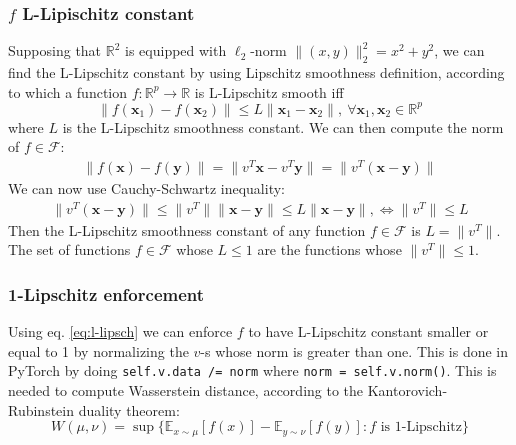 \documentclass[12pt]{article}
\begin{document}
\subsubsection{\texorpdfstring{$f$}{Lg} L-Lipischitz constant}
Supposing that $\mathbb{R}^{2}$ is equipped with $\ell_{2}$-norm $\lVert (x, y) \rVert_{2}^{2} = x^{2} + y^{2}$, we can find the L-Lipschitz constant by using Lipschitz smoothness definition, according to which a function $f : \mathbb{R}^p \rightarrow \mathbb{R}$ is L-Lipschitz smooth iff
\begin{equation} \label{def:lipschitz}
    \lVert f(\mathbf{x}_{1}) - f(\mathbf{x}_{2}) \rVert \leq L \lVert \mathbf{x}_{1} - \mathbf{x}_{2} \rVert, 
        \ \forall \mathbf{x}_{1}, \mathbf{x}_{2} \in \mathbb{R}^{p}
\end{equation}
where $L$ is the L-Lipschitz smoothness constant. We can then compute the norm of $f \in \mathcal{F}$:
\begin{gather}
    \lVert f(\mathbf{x}) - f(\mathbf{y}) \rVert = \lVert v^{T} \mathbf{x} - v^{T} \mathbf{y} \rVert = 
        \lVert v^{T} (\mathbf{x} - \mathbf{y}) \rVert
\end{gather}
We can now use Cauchy-Schwartz inequality:
\begin{gather} \label{eq:l-lipsch}
        \lVert v^{T} (\mathbf{x} - \mathbf{y}) \rVert \leq \lVert v^{T} \rVert \lVert \mathbf{x} - \mathbf{y} \rVert \leq L \lVert \mathbf{x} - \mathbf{y} \rVert, \iff \lVert v^{T} \rVert \leq L
\end{gather}
Then the L-Lipschitz smoothness constant of any function $f \in \mathcal{F}$ is $L = \lVert v^{T} \rVert$. The set of functions $f \in \mathcal{F}$ whose $L \leq 1$ are the functions whose $\lVert v^{T} \rVert \leq 1$.

\subsubsection{1-Lipschitz enforcement}

Using eq. \eqref{eq:l-lipsch} we can enforce $f$ to have L-Lipschitz constant smaller or equal to 1 by normalizing the $v$-s whose norm is greater than one. This is done in PyTorch by doing \texttt{self.v.data /= norm} where \texttt{norm = self.v.norm()}. This is needed to compute Wasserstein distance, according to the Kantorovich-Rubinstein duality theorem:
\begin{equation}
    W(\mu, \nu) = \sup{\{ \mathbb{E}_{x \sim \mu} [f(x)] - \mathbb{E}_{y \sim \nu} [f(y)] : f \text{ is 1-Lipschitz} \}} \label{eq:wasserstein}
\end{equation}{}
\end{document}
